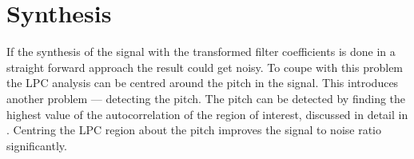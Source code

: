 \section{Synthesis} %
\label{sec:synthesis}
If the synthesis of the signal with the transformed filter coefficients is done in a straight forward approach the result could get noisy. To coupe with this problem the LPC analysis can be centred around the pitch in the signal. This introduces another problem --- detecting the pitch. The pitch can be detected by finding the highest value of the autocorrelation of the region of interest, discussed in detail in \cite[p. 324]{taletek}. Centring the LPC region about the pitch improves the signal to noise ratio significantly.
